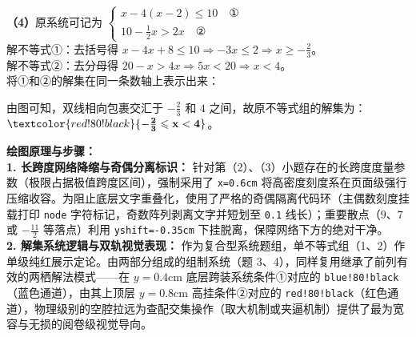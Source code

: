 \documentclass[12pt, a4paper]{ctexrep}
\begin{document}
\vspace{0.4cm}
\textbf{（4）}原系统可记为 $\begin{cases} x-4(x-2) \leqslant 10 \quad \text{①} \\ 10-\frac{1}{2}x > 2x \quad \text{②} \end{cases}$ \\
解不等式①：去括号得 $x-4x+8 \leqslant 10 \Rightarrow -3x \leqslant 2 \Rightarrow x \geqslant -\frac{2}{3}$。\\
解不等式②：去分母得 $20-x > 4x \Rightarrow 5x < 20 \Rightarrow x < 4$。\\
将①和②的解集在同一条数轴上表示出来：
\begin{center}
\end{center}
由图可知，双线相向包裹交汇于 $-\frac{2}{3}$ 和 $4$ 之间，故原不等式组的解集为：$\textcolor{red!80!black}{\mathbf{-\frac{2}{3} \leqslant x < 4}}$。

\vspace{0.4cm}
{\small\color{blue!70!black}
\textbf{绘图原理与步骤：}\\
\textbf{1. 长跨度网络降缩与奇偶分离标识：} 针对第（2）、（3）小题存在的长跨度度量参数（极限占据极值跨度区间），强制采用了 \texttt{x=0.6cm} 将高密度刻度系在页面级强行压缩收容。为阻止底层文字重叠化，使用了严格的奇偶隔离代码环（主偶数刻度挂载打印 \texttt{node} 字符标记，奇数阵列剥离文字并短划至 \texttt{0.1} 线长）；重要散点（$9$、$7$ 或 $-\frac{11}{2}$ 等落点）利用 \texttt{yshift=-0.35cm} 下挂脱离，保障网络下方的绝对干净。\\
\textbf{2. 解集系统逻辑与双轨视觉表现：} 作为复合型系统题组，单不等式组（1、2）作单级纯红展示定论。由两部分组成的组制系统（题 3、4），同样复用继承了前列有效的两栖解法模式——在 $y=0.4\mathrm{cm}$ 底层跨装系统条件①对应的 \texttt{blue!80!black}（蓝色通道），由其上顶层 $y=0.8\mathrm{cm}$ 高挂条件②对应的 \texttt{red!80!black}（红色通道），物理级别的空腔拉远为查配交集操作（取大机制或夹逼机制）提供了最为宽容与无损的阅卷级视觉导向。
}
\end{document}
